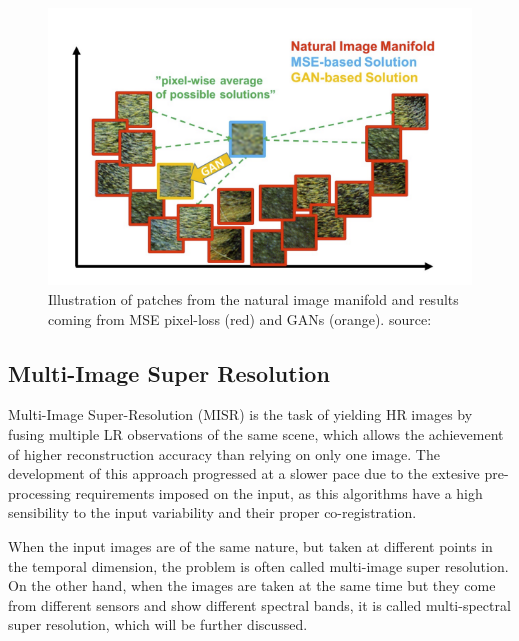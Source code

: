         \begin{figure}[H]
            \centering
            \includegraphics[width=\textwidth]{Includes/2-gans-natural-manifold.png}
            \caption{Illustration of patches from the natural image manifold and results coming from MSE pixel-loss (red) and GANs (orange). source:\cite{ledig2017photorealistic}}
            \label{fig:2-gans-natural-manifold}
        \end{figure}

















       




    \subsection{Multi-Image Super Resolution}

        Multi-Image Super-Resolution (MISR) is the task of yielding HR images by fusing multiple LR observations of the same scene, which allows the achievement of higher reconstruction accuracy than relying on only one image.
        The development of this approach progressed at a slower pace due to the extesive pre-processing requirements imposed on the input, as this algorithms have a high sensibility to the input variability and their proper co-registration.  

        When the input images are of the same nature, but taken at different points in the temporal dimension, the problem is often called multi-image super resolution.
        On the other hand, when the images are taken at the same time but they come from different sensors and show different spectral bands, it is called multi-spectral super resolution, which will be further discussed. 

